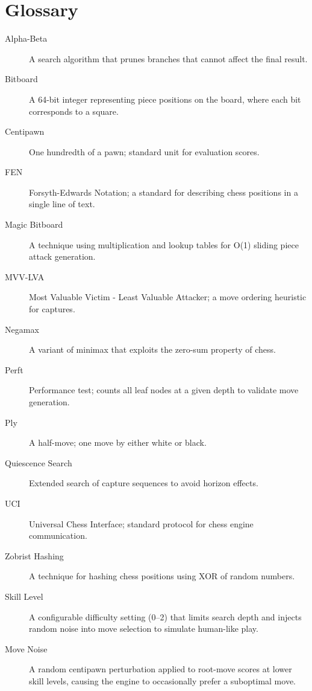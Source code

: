 \documentclass[11pt,a4paper]{report}
\begin{document}
\appendix
\chapter{Glossary}

\begin{description}
    \item[Alpha-Beta] A search algorithm that prunes branches that cannot affect the final result.
    \item[Bitboard] A 64-bit integer representing piece positions on the board, where each bit corresponds to a square.
    \item[Centipawn] One hundredth of a pawn; standard unit for evaluation scores.
    \item[FEN] Forsyth-Edwards Notation; a standard for describing chess positions in a single line of text.
    \item[Magic Bitboard] A technique using multiplication and lookup tables for O(1) sliding piece attack generation.
    \item[MVV-LVA] Most Valuable Victim - Least Valuable Attacker; a move ordering heuristic for captures.
    \item[Negamax] A variant of minimax that exploits the zero-sum property of chess.
    \item[Perft] Performance test; counts all leaf nodes at a given depth to validate move generation.
    \item[Ply] A half-move; one move by either white or black.
    \item[Quiescence Search] Extended search of capture sequences to avoid horizon effects.
    \item[UCI] Universal Chess Interface; standard protocol for chess engine communication.
    \item[Zobrist Hashing] A technique for hashing chess positions using XOR of random numbers.
    \item[Skill Level] A configurable difficulty setting (0--2) that limits search depth and injects random noise into move selection to simulate human-like play.
    \item[Move Noise] A random centipawn perturbation applied to root-move scores at lower skill levels, causing the engine to occasionally prefer a suboptimal move.
\end{description}
\end{document}

